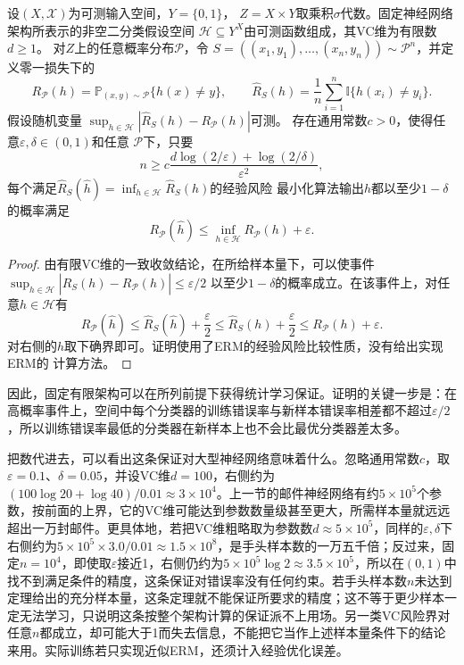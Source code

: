 \begin{theorem}[有限VC维神经网络的不可知PAC样本量保证]
\label{thm:network-vc-pac}
设$(X,\mathcal X)$为可测输入空间，$Y=\{0,1\}$，
$Z=X\times Y$取乘积$\sigma$代数。固定神经网络架构所表示的非空二分类假设空间
$\mathcal H\subseteq Y^X$由可测函数组成，其VC维为有限数$d\geq1$。
对$Z$上的任意概率分布$\mathcal P$，令
$S=((x_1,y_1),\ldots,(x_n,y_n))\sim\mathcal P^n$，并定义零一损失下的
\[
 R_{\mathcal P}(h)=\mathbb P_{(x,y)\sim\mathcal P}\{h(x)\neq y\},
 \qquad
 \hat R_S(h)=\frac1n\sum_{i=1}^n\mathbb I\{h(x_i)\neq y_i\}.
\]
假设随机变量
$\sup_{h\in\mathcal H}|\hat R_S(h)-R_{\mathcal P}(h)|$可测。
存在通用常数$c>0$，使得任意$\varepsilon,\delta\in(0,1)$和任意
$\mathcal P$下，只要
\[
 n\geq c\frac{d\log(2/\varepsilon)+\log(2/\delta)}{\varepsilon^2},
\]
每个满足$\hat R_S(\hat h)=\inf_{h\in\mathcal H}\hat R_S(h)$的经验风险
最小化算法输出$\hat h$都以至少$1-\delta$的概率满足
\[
 R_{\mathcal P}(\hat h)\leq\inf_{h\in\mathcal H}R_{\mathcal P}(h)+\varepsilon.
\]
\end{theorem}
\begin{proof}
由有限VC维的一致收敛结论，在所给样本量下，可以使事件
$\sup_{h\in\mathcal H}|\hat R_S(h)-R_{\mathcal P}(h)|\leq\varepsilon/2$
以至少$1-\delta$的概率成立。在该事件上，对任意$h\in\mathcal H$有
\[
 R_{\mathcal P}(\hat h)
 \leq\hat R_S(\hat h)+\frac\varepsilon2
 \leq\hat R_S(h)+\frac\varepsilon2
 \leq R_{\mathcal P}(h)+\varepsilon.
\]
对右侧的$h$取下确界即可。证明使用了ERM的经验风险比较性质，没有给出实现ERM的
计算方法。
\end{proof}

因此，固定有限架构可以在所列前提下获得统计学习保证。证明的关键一步是：在高概率事件上，空间中每个分类器的训练错误率与新样本错误率相差都不超过$\varepsilon/2$，所以训练错误率最低的分类器在新样本上也不会比最优分类器差太多。

把数代进去，可以看出这条保证对大型神经网络意味着什么。忽略通用常数$c$，取$\varepsilon=0.1$、$\delta=0.05$，并设VC维$d=100$，右侧约为$(100\log 20+\log 40)/0.01\approx3\times10^4$。上一节的邮件神经网络有约$5\times10^5$个参数，按前面的上界，它的VC维可能达到参数数量级甚至更大，所需样本量就远远超出一万封邮件。更具体地，若把VC维粗略取为参数数$d\approx5\times10^5$，同样的$\varepsilon,\delta$下右侧约为$5\times10^5\times3.0/0.01\approx1.5\times10^8$，是手头样本数的一万五千倍；反过来，固定$n=10^4$，即使取$\varepsilon$接近1，右侧仍约为$5\times10^5\log2\approx3.5\times10^5$，所以在$(0,1)$中找不到满足条件的精度，这条保证对错误率没有任何约束。若手头样本数$n$未达到定理给出的充分样本量，这条定理就不能保证所要求的精度；这不等于更少样本一定无法学习，只说明这条按整个架构计算的保证派不上用场。另一类VC风险界对任意$n$都成立，却可能大于1而失去信息，不能把它当作上述样本量条件下的结论来用。实际训练若只实现近似ERM，还须计入经验优化误差。

